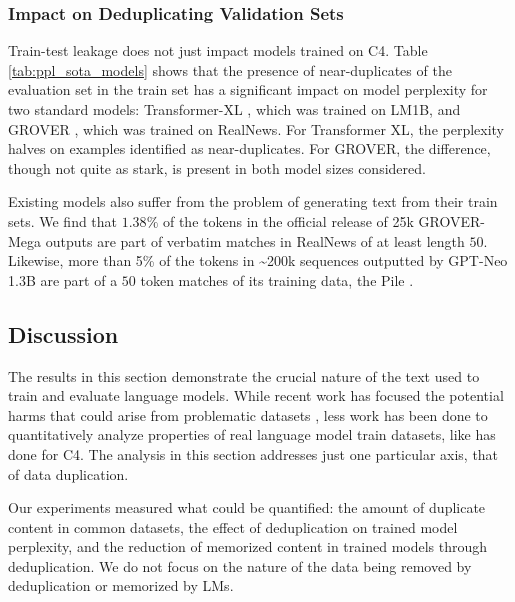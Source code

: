 \subsubsection{Impact on Deduplicating Validation Sets} \label{sec:eval-existing-models}
Train-test leakage does not just impact models trained on C4.
Table \ref{tab:ppl_sota_models} shows that
the presence of near-duplicates of the evaluation set
in the train set has a significant impact on model perplexity for two standard models: Transformer-XL \citep{dai2019transformer}, which was trained on LM1B, and GROVER \citep{zellers2019defending}, which was trained on RealNews.
For Transformer XL, the perplexity halves on examples identified as near-duplicates.
For GROVER, the difference, though not quite as stark, is present in both model sizes considered.

Existing models also suffer from the problem of generating text from their train sets.
We find that $1.38\%$ of the tokens in the official release of 25k GROVER-Mega outputs
are part of verbatim matches in RealNews of at least length $50$.
Likewise, more than 5\% of the tokens in \textasciitilde 200k sequences outputted by GPT-Neo 1.3B \citep{gpt-neo} are part of a $50$ token matches of its training data, the Pile \citep{pile}.

\subsection{Discussion}
The results in this section demonstrate the crucial nature of the text used to train and evaluate language models.
While recent work has focused the potential harms that could arise from problematic datasets  \cite{bender2018data, gebru2020datasheets}, less work has been done to 
quantitatively analyze properties of real language model train datasets, like \citet{dodge2021documenting} has done for C4.
The analysis in this section addresses just one particular axis, that of data duplication.

Our experiments measured what could be quantified: the amount of duplicate content in common datasets, the effect of deduplication on trained model perplexity, and the reduction of memorized content in trained models through deduplication.
We do not focus on the nature of the data being removed by deduplication or memorized by LMs.


